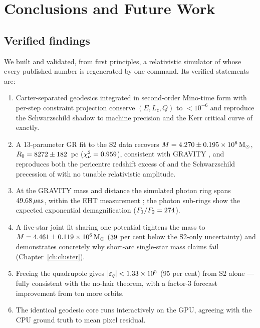\chapter{Conclusions and Future Work}
\label{ch:conclusions}

\section{Verified findings}
\label{sec:findings}

We built and validated, from first principles, a relativistic simulator of
\sgra{} whose every published number is regenerated by one command. Its
verified statements are:

\begin{enumerate}
\item Carter-separated geodesics integrated in second-order Mino-time form
with per-step constraint projection conserve $(E, L_z, Q)$ to $<10^{-6}$
and reproduce the Schwarzschild shadow to machine precision and the Kerr
critical curve of \citet{Bardeen1973} exactly.
\item A 13-parameter GR fit to the \citet{Gillessen2017} S2 data recovers
$M = 4.270\pm0.195\times10^6\,\mathrm{M}_\odot$,
$R_0 = 8272\pm182$~pc
($\chi^2_\nu = 0.959$), consistent with GRAVITY
\citep{Gravity2022}, and reproduces both the pericentre redshift excess of
\citet{Gravity2018} and the Schwarzschild precession of
\citet{Gravity2020} with no tunable relativistic amplitude.
\item At the GRAVITY mass and distance the simulated photon ring spans
$49.68\,\mu\mathrm{as}$, within the EHT measurement \citep{EHT2022}; the
photon sub-rings show the expected exponential demagnification
($F_1/F_2 = 274$).
\item A five-star joint fit sharing one potential tightens the mass to
$M = 4.461\pm0.119\times10^6\,\mathrm{M}_\odot$
($39$ per cent below the S2-only uncertainty) and
demonstrates concretely why short-arc single-star mass claims fail
(Chapter~\ref{ch:cluster}).
\item Freeing the quadrupole gives
$|\varepsilon_q| < 1.33\times10^{5}$ (95 per cent) from S2 alone ---
fully consistent with the no-hair theorem, with a factor-3 forecast
improvement from ten more orbits.
\item The identical geodesic core runs interactively on the GPU, agreeing
with the CPU ground truth to \GpuMeanDiff{} mean pixel residual.
\end{enumerate}

